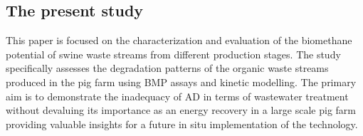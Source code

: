 \subsection{The present study}
This paper is focused on the characterization and evaluation of the biomethane potential of swine waste streams from different production stages. The study specifically assesses the degradation patterns of the organic waste streams produced in the pig farm using BMP assays and kinetic modelling. The primary aim is to demonstrate the inadequacy of AD in terms of wastewater treatment without devaluing its importance as an energy recovery in a large scale pig farm providing valuable insights for a future in situ implementation of the technology.